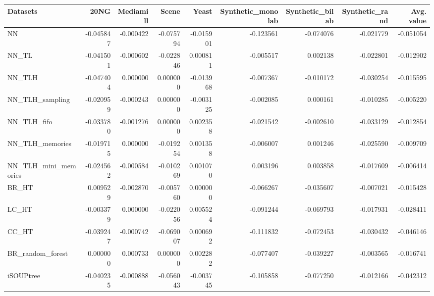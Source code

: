 \begin{tabular}{lrrrrrrrr}
\toprule
Datasets &      20NG &  Mediamill &     Scene &     Yeast &  Synthetic\_monolab &  Synthetic\_bilab &  Synthetic\_rand &  Avg. value \\
\midrule
NN                   & -0.045847 &  -0.000422 & -0.075794 & -0.015901 &          -0.123561 &        -0.074076 &       -0.021779 &   -0.051054 \\
NN\_TL                & -0.041501 &  -0.000602 & -0.022846 &  0.000811 &          -0.005517 &         0.002138 &       -0.022801 &   -0.012902 \\
NN\_TLH               & -0.047404 &   0.000000 &  0.000000 & -0.013968 &          -0.007367 &        -0.010172 &       -0.030254 &   -0.015595 \\
NN\_TLH\_sampling      & -0.020959 &  -0.000243 &  0.000000 & -0.003125 &          -0.002085 &         0.000161 &       -0.010285 &   -0.005220 \\
NN\_TLH\_fifo          & -0.033780 &  -0.001276 &  0.000000 &  0.002358 &          -0.021542 &        -0.002610 &       -0.033129 &   -0.012854 \\
NN\_TLH\_memories      & -0.019715 &   0.000000 & -0.019254 &  0.001358 &          -0.006007 &         0.001246 &       -0.025590 &   -0.009709 \\
NN\_TLH\_mini\_memories & -0.024562 &  -0.000584 & -0.010269 &  0.001070 &           0.003196 &         0.003858 &       -0.017609 &   -0.006414 \\
BR\_HT                &  0.009529 &  -0.002870 & -0.005760 &  0.000000 &          -0.066267 &        -0.035607 &       -0.007021 &   -0.015428 \\
LC\_HT                & -0.003379 &   0.000000 & -0.022056 &  0.005524 &          -0.091244 &        -0.069793 &       -0.017931 &   -0.028411 \\
CC\_HT                & -0.039247 &  -0.000742 & -0.069007 &  0.000692 &          -0.111832 &        -0.072453 &       -0.030432 &   -0.046146 \\
BR\_random\_forest     &  0.000000 &   0.000733 &  0.000000 &  0.002282 &          -0.077407 &        -0.039227 &       -0.003565 &   -0.016741 \\
iSOUPtree            & -0.040235 &  -0.000888 & -0.056043 & -0.003745 &          -0.105858 &        -0.077250 &       -0.012166 &   -0.042312 \\
\bottomrule
\end{tabular}
